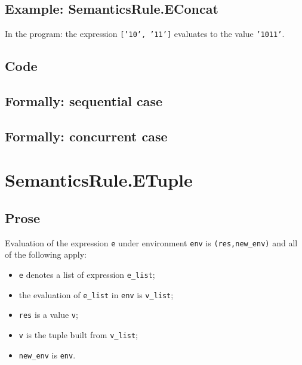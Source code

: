 \documentclass{book}
\begin{document}
  \subsection{Example: SemanticsRule.EConcat}
    In the program:
    the expression \texttt{['10', '11']} evaluates to the value \texttt{'1011'}.

  \subsection{Code}

\begin{emptyformal}
  \subsection{Formally: sequential case}

  \subsection{Formally: concurrent case}
\end{emptyformal}


\section{SemanticsRule.ETuple \label{sec:SemanticsRule.ETuple}}

  \subsection{Prose}
  Evaluation of the expression \texttt{e} under environment \texttt{env} is
  \texttt{(res,new\_env)} and all of the following apply:
  \begin{itemize}
  \item \texttt{e} denotes a list of expression \texttt{e\_list};
  \item the evaluation of \texttt{e\_list} in \texttt{env} is \texttt{v\_list};
  \item \texttt{res} is a value \texttt{v};
  \item \texttt{v} is the tuple built from \texttt{v\_list};
  \item \texttt{new\_env} is \texttt{env}.
  \end{itemize}
\end{document}

